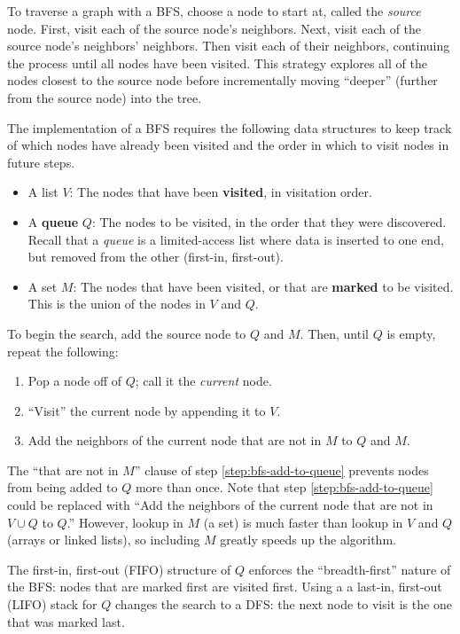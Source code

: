 To traverse a graph with a BFS, choose a node to start at, called the \emph{source} node.
First, visit each of the source node's neighbors.
Next, visit each of the source node's neighbors' neighbors.
Then visit each of their neighbors, continuing the process until all nodes have been visited.
This strategy explores all of the nodes closest to the source node before incrementally moving ``deeper'' (further from the source node) into the tree.

The implementation of a BFS requires the following data structures to keep track of which nodes have already been visited and the order in which to visit nodes in future steps.
\begin{itemize}
    \item A list $V$: The nodes that have been \textbf{visited}, in visitation order.
    \item A \textbf{queue} $Q$: The nodes to be visited, in the order that they were discovered.
    Recall that a \emph{queue} is a limited-access list where data is inserted to one end, but removed from the other (first-in, first-out).
    \item A set $M$: The nodes that have been visited, or that are \textbf{marked} to be visited.
    This is the union of the nodes in $V$ and $Q$.
\end{itemize}
To begin the search, add the source node to $Q$ and $M$.
Then, until $Q$ is empty, repeat the following:
\begin{enumerate}
    \item Pop a node off of $Q$; call it the \emph{current} node.
    \item ``Visit'' the current node by appending it to $V$.
    \item Add the neighbors of the current node that are not in $M$ to $Q$ and $M$.
    \label{step:bfs-add-to-queue}
\end{enumerate}
The ``that are not in $M$'' clause of step \ref{step:bfs-add-to-queue} prevents nodes from being added to $Q$ more than once.
Note that step \ref{step:bfs-add-to-queue} could be replaced with ``Add the neighbors of the current node that are not in $V \cup Q$ to $Q$.''
However, lookup in $M$ (a set) is much faster than lookup in $V$ and $Q$ (arrays or linked lists), so including $M$ greatly speeds up the algorithm.

\begin{info}
The first-in, first-out (FIFO) structure of $Q$ enforces the ``breadth-first'' nature of the BFS: nodes that are marked first are visited first.
Using a a last-in, first-out (LIFO) stack for $Q$ changes the search to a DFS: the next node to visit is the one that was marked last.
\end{info}

